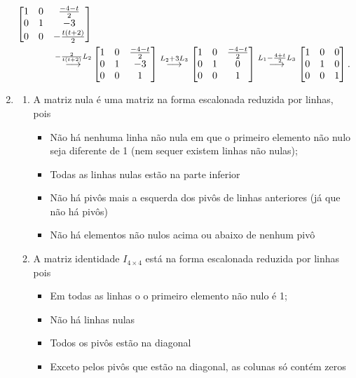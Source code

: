 \documentclass[12pt,a4paper]{article}
\newcommand{\grstep}[2][\relax]{%
   \ensuremath{\mathrel{
       {\mathop{\longrightarrow}\limits^{#2\mathstrut}_{
                                     \begin{subarray}{l} #1 \end{subarray}}}}}}
\begin{document}
\begin{enumerate}
\begin{align*}
\begin{bmatrix}
1 & 0 & \frac{-4-t}{2} \\
0 & 1 & -3 \\
0 & 0 & -\frac{t(t+2)}{2}
\end{bmatrix}\\
\grstep{ -\frac{2}{t(t+2)} L_2 }
& \begin{bmatrix}
1 & 0 & \frac{-4-t}{2} \\
0 & 1 & -3 \\
0 & 0 & 1
\end{bmatrix}
\grstep{ L_2 + 3 L_3}
\begin{bmatrix}
1 & 0 & \frac{-4-t}{2} \\
0 & 1 & 0 \\
0 & 0 & 1
\end{bmatrix}
\grstep{ L_1 -\frac{4+t}{2} L_3}
\begin{bmatrix}
1 & 0 & 0 \\
0 & 1 & 0 \\
0 & 0 & 1
\end{bmatrix}.
\end{align*}

\item
\begin{enumerate}
\item A matriz nula é uma matriz na forma escalonada reduzida por linhas, pois 
\begin{itemize}
\item Não há nenhuma linha não nula em que o primeiro elemento não nulo seja diferente de 1 (nem sequer existem linhas não nulas);
\item Todas as linhas nulas estão na parte inferior
\item Não há pivôs mais a esquerda dos pivôs de linhas anteriores (já que não há pivôs)
\item Não há elementos não nulos acima ou abaixo de nenhum pivô
\end{itemize}
\item A matriz identidade $I_{4 \times 4}$ está na forma escalonada reduzida por linhas pois
\begin{itemize}
\item Em todas as linhas o o primeiro elemento não nulo é 1;
\item Não há linhas nulas
\item Todos os pivôs estão na diagonal
\item Exceto pelos pivôs que estão na diagonal, as colunas só contém zeros
\end{itemize}


\end{enumerate}
\end{enumerate}
\end{document}
